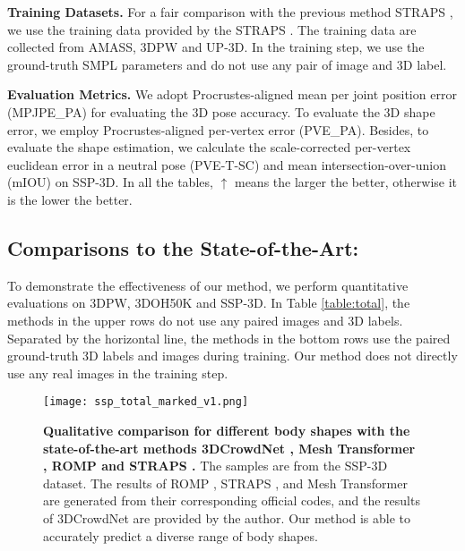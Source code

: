 \documentclass[journal]{IEEEtran}
\begin{document}
\noindent\textbf{Training Datasets.} For a fair comparison with the previous method STRAPS \cite{STRAPS2020BMVC}, we use the training data provided by the STRAPS \cite{STRAPS2020BMVC}. The training data are collected from AMASS, 3DPW and UP-3D. In the training step, we use the ground-truth SMPL parameters and do not use any pair of image and 3D label.

\noindent\textbf{Evaluation Metrics.} We adopt Procrustes-aligned \cite{mehta2017monocular} mean per joint position error (MPJPE\_PA) for evaluating the 3D pose accuracy. To evaluate the 3D shape error, we employ Procrustes-aligned per-vertex error (PVE\_PA). Besides, to evaluate the shape estimation, we calculate the scale-corrected per-vertex euclidean error in a neutral pose (PVE-T-SC) and mean intersection-over-union (mIOU) on SSP-3D. In all the tables, $\uparrow$ means the larger the better, otherwise it is the lower the better.


\subsection{Comparisons to the State-of-the-Art:}

To demonstrate the effectiveness of our method, we perform quantitative evaluations on 3DPW, 3DOH50K and SSP-3D. In Table \ref{table:total}, the methods in the upper rows do not use any paired images and 3D labels. Separated by the horizontal line, the methods in the bottom rows use the paired ground-truth 3D labels and images during training. Our method does not directly use any real images in the training step.

\begin{figure*}[htbp]
    
    \centerline{\texttt{[image: ssp\_total\_marked\_v1.png]}}
    \caption{\textbf{Qualitative comparison for different body shapes with the state-of-the-art methods 3DCrowdNet \cite{choi20213dcrowdnet}, Mesh Transformer \cite{lin2021end-to-end}, ROMP \cite{ROMP} and STRAPS \cite{STRAPS2020BMVC}.} The samples are from the SSP-3D dataset. The results of ROMP \cite{ROMP}, STRAPS \cite{STRAPS2020BMVC}, and Mesh Transformer \cite{lin2021end-to-end} are generated from their corresponding official codes, and the results of 3DCrowdNet \cite{choi20213dcrowdnet} are provided by  the author. Our method is able to accurately predict a diverse range of body shapes.}
    \label{fig:ssp}
\end{figure*}
\end{document}
